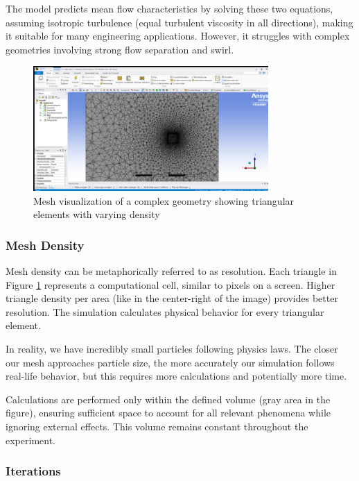 \documentclass[12pt,a4paper]{article}
\begin{document}
The model predicts mean flow characteristics by solving these two equations, assuming isotropic turbulence (equal turbulent viscosity in all directions), making it suitable for many engineering applications. However, it struggles with complex geometries involving strong flow separation and swirl.

\begin{figure}[H]
    \centering
    \includegraphics[width=0.8\textwidth]{image9.png}
    \caption{Mesh visualization of a complex geometry showing triangular elements with varying density}
    \label{fig:mesh_example}
\end{figure}

\subsubsection{Mesh Density}

Mesh density can be metaphorically referred to as resolution. Each triangle in Figure \ref{fig:mesh_example} represents a computational cell, similar to pixels on a screen. Higher triangle density per area (like in the center-right of the image) provides better resolution. The simulation calculates physical behavior for every triangular element.

In reality, we have incredibly small particles following physics laws. The closer our mesh approaches particle size, the more accurately our simulation follows real-life behavior, but this requires more calculations and potentially more time.

Calculations are performed only within the defined volume (gray area in the figure), ensuring sufficient space to account for all relevant phenomena while ignoring external effects. This volume remains constant throughout the experiment.

\subsubsection{Iterations}
\end{document}
